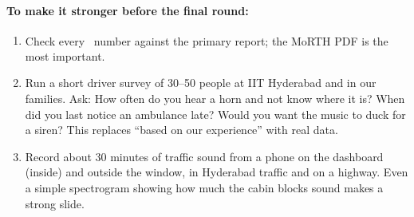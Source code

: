 \documentclass[11pt]{article}
\newcommand{\chk}{\textsuperscript{\color{alert}\dag}}
\begin{document}
\textbf{To make it stronger before the final round:}
\begin{enumerate}[leftmargin=*]
  \item Check every \chk\ number against the primary report; the MoRTH PDF is the most important.
  \item Run a short driver survey of 30--50 people at IIT Hyderabad and in our families. Ask: How often do you hear a horn and not know where it is? When did you last notice an ambulance late? Would you want the music to duck for a siren? This replaces ``based on our experience'' with real data.
  \item Record about 30 minutes of traffic sound from a phone on the dashboard (inside) and outside the window, in Hyderabad traffic and on a highway. Even a simple spectrogram showing how much the cabin blocks sound makes a strong slide.
\end{enumerate}

\end{document}
